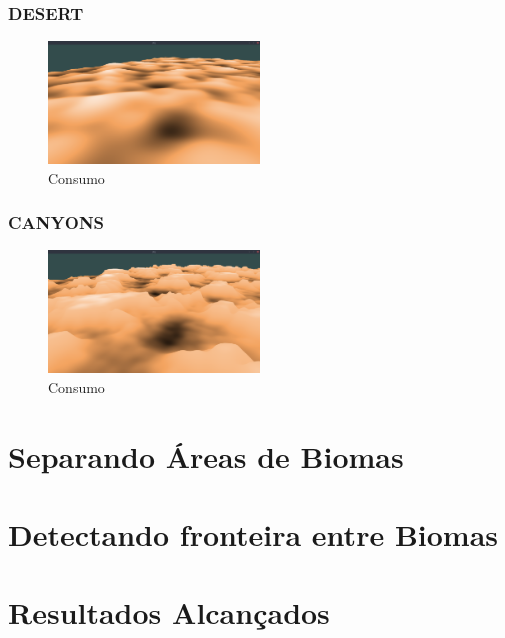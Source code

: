 \subsubsection{DESERT}


\begin{figure}[H]
    \centering
    \includegraphics[width=0.5\textwidth]{figuras/bssDesert.png}
    \caption{Consumo}
    \label{fig:bssDesert}
\end{figure}

\subsubsection{CANYONS}


\begin{figure}[H]
    \centering
    \includegraphics[width=0.5\textwidth]{figuras/bssCanyons.png}
    \caption{Consumo}
    \label{fig:bssCanyons}
\end{figure}

\section{Separando Áreas de Biomas}

\section{Detectando fronteira entre Biomas}

\section{Resultados Alcançados}